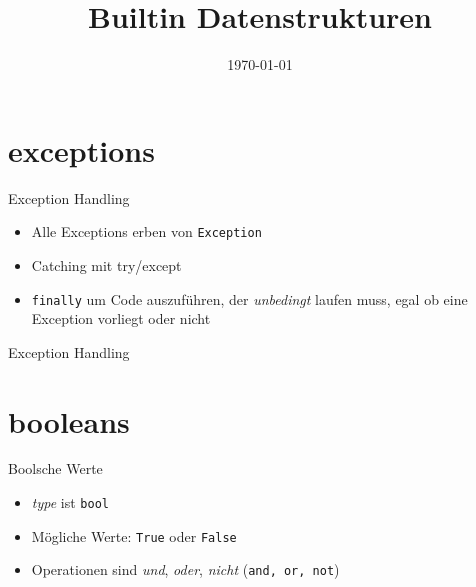 \usepackage[utf8]{inputenc}

\newcommand{\topic}{
	Builtin Datenstrukturen
}

\title{\topic}
\supertitle{\course}
\date{\today}



\maketitle

\begin{frame}
	\tableofcontents
\end{frame}

\section{exceptions}
\begin{frame}{Exception Handling}
\begin{itemize}
	\item Alle Exceptions erben von \texttt{Exception}
	\item Catching mit try/except
	\item \texttt{finally} um Code auszuf\"uhren, der \textit{unbedingt} laufen muss, egal ob eine Exception vorliegt oder nicht
\end{itemize}
\end{frame}
\begin{frame}{Exception Handling}

\end{frame}

\section{booleans}
\begin{frame}{Boolsche Werte}
\begin{itemize}
	\item \textit{type} ist \texttt{bool}
	\item Mögliche Werte: \texttt{True} oder \texttt{False}
	\item Operationen sind \textit{und}, \textit{oder}, \textit{nicht} (\texttt{and, or, not})
\end{itemize}
\end{frame}

